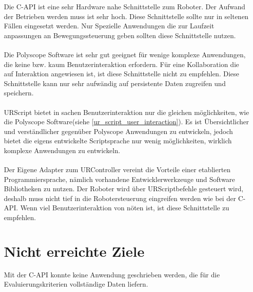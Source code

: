 Die C-API ist eine sehr Hardware nahe Schnittstelle zum Roboter. Der Aufwand der Betrieben werden muss ist sehr hoch. Diese Schnittstelle sollte nur in seltenen Fällen eingesetzt werden. Nur Spezielle Anwendungen die zur Laufzeit anpassungen an Bewegungssteuerung geben sollten diese Schnittstelle nutzen.
\\\\
Die Polyscope Software ist sehr gut geeignet für wenige komplexe Anwendungen, die keine bzw. kaum Benutzerinteraktion erfordern. Für eine Kollaboration die auf Interaktion angewiesen ist, ist diese Schnittstelle nicht zu empfehlen. Diese Schnittstelle kann nur sehr aufwändig auf persistente Daten zugreifen und speichern.
\\\\
URScript bietet in sachen Benutzerinteraktion nur die gleichen möglichkeiten, wie die Polyscope Software(siehe \ref{ur_script_user_interaction}). Es ist Übersichtlicher und verständlicher gegenüber Polyscope Anwendungen zu entwickeln, jedoch bietet die eigens entwickelte Scriptsprache nur wenig möglichkeiten, wirklich komplexe Anwendungen zu entwickeln.
\\\\
Der Eigene Adapter zum URController vereint die Vorteile einer etablierten Programmiersprache, nämlich vorhandene Entwicklerwerkzeuge und \ac{Software Bibliotheken} zu nutzen. Der Roboter wird über URScriptbefehle gesteuert wird, deshalb muss nicht tief in die Robotersteuerung eingreifen werden wie bei der C-API. Wenn viel Benutzerinteraktion von nöten ist, ist diese Schnittstelle zu empfehlen.

\section{Nicht erreichte Ziele}
\label{sec:Nicht_erreichte_ziele}

Mit der C-API konnte keine Anwendung geschrieben werden, die für die Evaluierungskriterien vollständige Daten liefern.